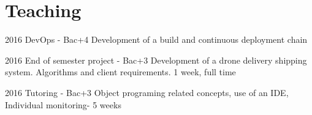 \section{Teaching}

\begin{yearlist}

\item{2016}
     {DevOps - Bac+4}
     {Development of a build and continuous deployment chain}

\item{2016}
     {End of semester project - Bac+3}
     {Development of a drone delivery shipping system. Algorithms and client requirements. 1 week, full time}

\item{2016}
     {Tutoring  - Bac+3}
     {Object programing related concepts, use of an IDE, Individual monitoring- 5 weeks}

\end{yearlist}